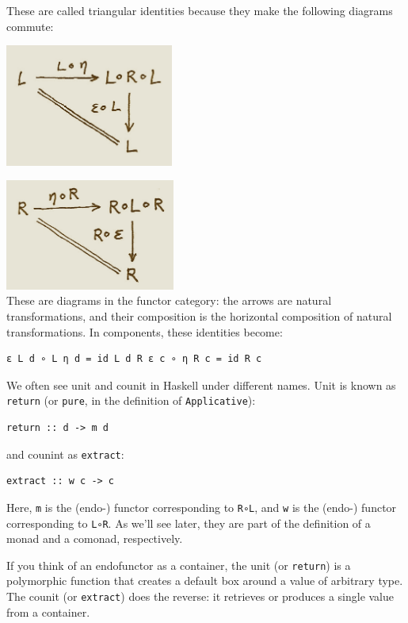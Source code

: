 These are called triangular identities because they make the following
diagrams commute:

\includegraphics[width=2.17708in]{images/triangles.png}

\includegraphics[width=2.19792in]{images/triangles-2.png}\\
These are diagrams in the functor category: the arrows are natural
transformations, and their composition is the horizontal composition of
natural transformations. In components, these identities become:

\begin{verbatim}
ε L d ∘ L η d = id L d R ε c ∘ η R c = id R c
\end{verbatim}

We often see unit and counit in Haskell under different names. Unit is
known as \texttt{return} (or \texttt{pure}, in the definition of
\texttt{Applicative}):

\begin{verbatim}
return :: d -> m d
\end{verbatim}

and counint as \texttt{extract}:

\begin{verbatim}
extract :: w c -> c
\end{verbatim}

Here, \texttt{m} is the (endo-) functor corresponding to \texttt{R∘L},
and \texttt{w} is the (endo-) functor corresponding to \texttt{L∘R}. As
we'll see later, they are part of the definition of a monad and a
comonad, respectively.

If you think of an endofunctor as a container, the unit (or
\texttt{return}) is a polymorphic function that creates a default box
around a value of arbitrary type. The counit (or \texttt{extract}) does
the reverse: it retrieves or produces a single value from a container.

